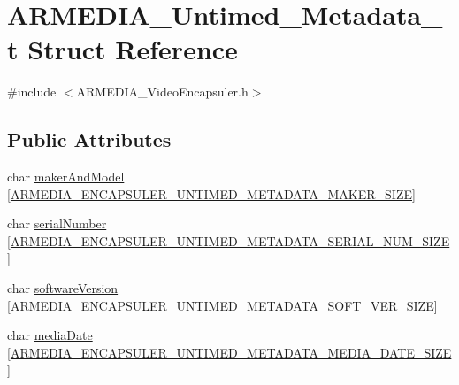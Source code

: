 \hypertarget{struct_a_r_m_e_d_i_a___untimed___metadata__t}{}\section{A\+R\+M\+E\+D\+I\+A\+\_\+\+Untimed\+\_\+\+Metadata\+\_\+t Struct Reference}
\label{struct_a_r_m_e_d_i_a___untimed___metadata__t}


{\ttfamily \#include $<$A\+R\+M\+E\+D\+I\+A\+\_\+\+Video\+Encapsuler.\+h$>$}

\subsection*{Public Attributes}
\begin{DoxyCompactItemize}
\item 
char \hyperlink{struct_a_r_m_e_d_i_a___untimed___metadata__t_a47fee96f3ef6834b4434e20e5e2a9036}{maker\+And\+Model} \mbox{[}\hyperlink{_a_r_m_e_d_i_a___video_encapsuler_8h_acf648410cf862b48daba4e43edbb5462}{A\+R\+M\+E\+D\+I\+A\+\_\+\+E\+N\+C\+A\+P\+S\+U\+L\+E\+R\+\_\+\+U\+N\+T\+I\+M\+E\+D\+\_\+\+M\+E\+T\+A\+D\+A\+T\+A\+\_\+\+M\+A\+K\+E\+R\+\_\+\+S\+I\+ZE}\mbox{]}
\item 
char \hyperlink{struct_a_r_m_e_d_i_a___untimed___metadata__t_a0773bfc1022eae519572fae845486247}{serial\+Number} \mbox{[}\hyperlink{_a_r_m_e_d_i_a___video_encapsuler_8h_a0ad265d65790b31157d3db003c86a764}{A\+R\+M\+E\+D\+I\+A\+\_\+\+E\+N\+C\+A\+P\+S\+U\+L\+E\+R\+\_\+\+U\+N\+T\+I\+M\+E\+D\+\_\+\+M\+E\+T\+A\+D\+A\+T\+A\+\_\+\+S\+E\+R\+I\+A\+L\+\_\+\+N\+U\+M\+\_\+\+S\+I\+ZE}\mbox{]}
\item 
char \hyperlink{struct_a_r_m_e_d_i_a___untimed___metadata__t_a4ce4b02ce21e5c6ed41d1ad4c98a5ac5}{software\+Version} \mbox{[}\hyperlink{_a_r_m_e_d_i_a___video_encapsuler_8h_ac3f3d8b8503def3d9dedff25860e2a96}{A\+R\+M\+E\+D\+I\+A\+\_\+\+E\+N\+C\+A\+P\+S\+U\+L\+E\+R\+\_\+\+U\+N\+T\+I\+M\+E\+D\+\_\+\+M\+E\+T\+A\+D\+A\+T\+A\+\_\+\+S\+O\+F\+T\+\_\+\+V\+E\+R\+\_\+\+S\+I\+ZE}\mbox{]}
\item 
char \hyperlink{struct_a_r_m_e_d_i_a___untimed___metadata__t_a48140fa0cb7dccec986f9a7494665499}{media\+Date} \mbox{[}\hyperlink{_a_r_m_e_d_i_a___video_encapsuler_8h_ab8d3a3711562abf39c698407579deffb}{A\+R\+M\+E\+D\+I\+A\+\_\+\+E\+N\+C\+A\+P\+S\+U\+L\+E\+R\+\_\+\+U\+N\+T\+I\+M\+E\+D\+\_\+\+M\+E\+T\+A\+D\+A\+T\+A\+\_\+\+M\+E\+D\+I\+A\+\_\+\+D\+A\+T\+E\+\_\+\+S\+I\+ZE}\mbox{]}
\item 

\end{DoxyCompactItemize}
